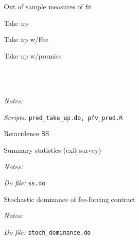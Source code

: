 \documentclass[11pt]{article}
\begin{document}
\begin{table}[H]
    \caption{Out of sample measures of fit}
    \label{Table_compliance}
    \begin{subtable}{1\textwidth}
      \centering
        \caption{Take up}
        \scriptsize{}
    \end{subtable}%
    
    \bigskip
    \begin{subtable}{1\textwidth}
      \centering
        \caption{Take up w/Fee}
        \scriptsize{}
    \end{subtable}
    
      \bigskip
    \begin{subtable}{1\textwidth}
      \centering
        \caption{Take up w/promise}
        \scriptsize{}
    \end{subtable}
            \scriptsize
           \\
           \\
           \\
  \textit{Notes:} 
    
     \textit{Scripts: } \texttt{pred\_take\_up.do, pfv\_pred.R}
\end{table}




\begin{table}[H]
\caption{Reincidence SS}
\label{tab_reincidence}
\begin{center}
\scriptsize{}
\end{center}
 \scriptsize
\end{table}




\begin{table}[H]
\caption{Summary statistics (exit survey)}
\label{SS_exit}
\begin{center}
\scriptsize{}
\end{center}
 \footnotesize
\textit{Notes:} 

\textit{Do file: } \texttt{ss.do}
\end{table}



\begin{table}[H]
\caption{Stochastic dominance of fee-forcing contract}
\label{stochastic_dominance}
\begin{center}
\scriptsize{}
\end{center}
 \footnotesize
\textit{Notes:} 

\textit{Do file: } \texttt{stoch\_dominance.do}
\end{table}
\end{document}
